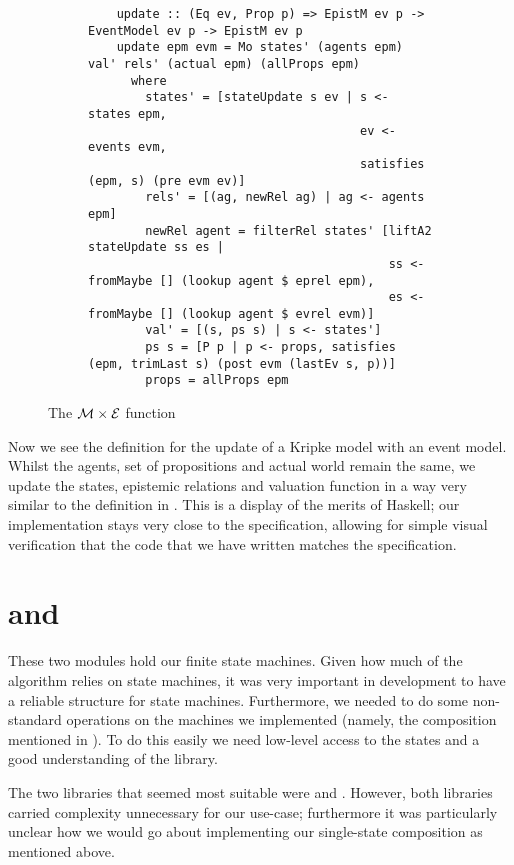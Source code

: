\documentclass[10pt, a4paper]{report}
\begin{document}
\begin{figure}[h]
  \begin{subfigure}[b]{0.5\textwidth}
  \begin{verbatim}
    update :: (Eq ev, Prop p) => EpistM ev p -> EventModel ev p -> EpistM ev p
    update epm evm = Mo states' (agents epm) val' rels' (actual epm) (allProps epm)
      where
        states' = [stateUpdate s ev | s <- states epm,
                                      ev <- events evm,
                                      satisfies (epm, s) (pre evm ev)]
        rels' = [(ag, newRel ag) | ag <- agents epm]
        newRel agent = filterRel states' [liftA2 stateUpdate ss es |
                                          ss <- fromMaybe [] (lookup agent $ eprel epm),
                                          es <- fromMaybe [] (lookup agent $ evrel evm)]
        val' = [(s, ps s) | s <- states']
        ps s = [P p | p <- props, satisfies (epm, trimLast s) (post evm (lastEv s, p))]
        props = allProps epm
  \end{verbatim}
\end{subfigure}
\caption{The $\mathcal{M} \times \mathcal{E}$ function}
\label{fig:update}
\end{figure}

Now we see the definition for the update of a Kripke model with an event model.
Whilst the agents, set of propositions and actual world remain the same, we
update the states, epistemic relations and valuation function in a way very
similar to the definition in . This is a display of
the merits of Haskell; our implementation stays very close to the specification,
allowing for simple visual verification that the code that we have written matches
the specification. 

\section{ and }

These two modules hold our finite state machines. Given how much of the
algorithm relies on state machines, it was very important in development to have
a reliable structure for state machines. Furthermore, we needed to do some
non-standard operations on the machines we implemented (namely, the composition
mentioned in ). To do this easily we need
low-level access to the states and a good understanding of the library. 

The two libraries that seemed most suitable were \cite{HaskellFST} and
\cite{HaskellMachines}. However, both libraries carried complexity unnecessary
for our use-case; furthermore it was particularly unclear how we would go
about implementing our single-state composition as mentioned above. 
\end{document}
